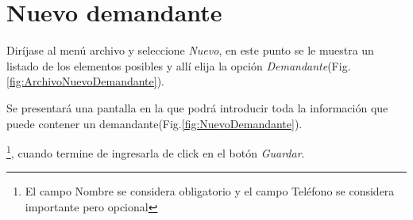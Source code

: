 \section{Nuevo demandante}
\label{sec:nuevoDemandante}
Dir\'ijase al men\'u archivo y seleccione \emph{Nuevo}, en este punto se le muestra un listado de los elementos posibles y
all\'i elija la opci\'on \emph{Demandante}(Fig.\ref{fig:ArchivoNuevoDemandante}). 
  

Se presentar\'a una pantalla en la que podr\'a introducir toda la informaci\'on
que puede contener un demandante(Fig.\ref{fig:NuevoDemandante}). 
  
\footnote{El campo Nombre se considera obligatorio y el campo Tel\'efono se
considera importante pero opcional},
cuando termine de ingresarla de click en el bot\'on \emph{Guardar}.



